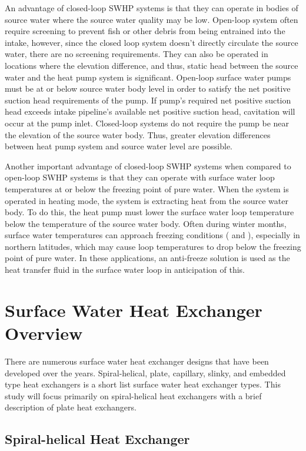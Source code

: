 An advantage of closed-loop SWHP systems is that they can operate in bodies of source water where the source water quality may be low. Open-loop system often require screening to prevent fish or other debris from being entrained into the intake, however, since the closed loop system doesn't directly circulate the source water, there are no screening requirements. They can also be operated in locations where the elevation difference, and thus, static head between the source water and the heat pump system is significant. Open-loop surface water pumps must be at or below source water body level in order to satisfy the net positive suction head requirements of the pump. If pump's required net positive suction head exceeds intake pipeline's available net positive suction head, cavitation will occur at the pump inlet. Closed-loop systems do not require the pump be near the elevation of the source water body. Thus, greater elevation differences between heat pump system and source water level are possible.

Another important advantage of closed-loop SWHP systems when compared to open-loop SWHP systems is that they can operate with surface water loop temperatures at or below the freezing point of pure water. When the system is operated in heating mode, the system is extracting heat from the source water body. To do this, the heat pump must lower the surface water loop temperature below the temperature of the source water body. Often during winter months, surface water temperatures can approach freezing conditions (\cite{KavanaughRafferty1997} and \cite{Selvakumar2013}), especially in northern latitudes, which may cause loop temperatures to drop below the freezing point of pure water. In these applications, an anti-freeze solution is used as the heat transfer fluid in the surface water loop in anticipation of this. 

\section{Surface Water Heat Exchanger Overview}
\label{sec:Intro:HXOverview}

There are numerous surface water heat exchanger designs that have been developed over the years. Spiral-helical, plate, capillary, slinky, and embedded type heat exchangers is a short list surface water heat exchanger types. This study will focus primarily on spiral-helical heat exchangers with a brief description of plate heat exchangers.
	
	\subsection{Spiral-helical Heat Exchanger}
	\label{subsec:Intro:HXOverview:SpHelHX}
	
